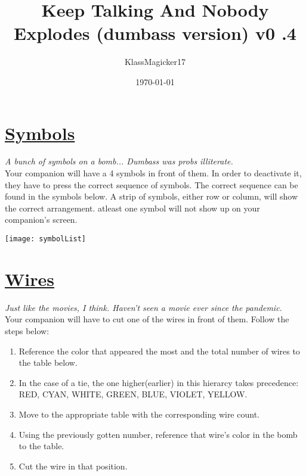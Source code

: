 \documentclass[letterpaper,12pt]{report}
\begin{document}
\title{\textbf{Keep Talking And Nobody Explodes (dumbass version) v0  .4}}
\author{KlassMagicker17}
\date{\today}
\maketitle

\section*{\underline{Symbols}}
\textit{A bunch of symbols on a bomb... Dumbass was probs illiterate.}\\[1cm]
Your companion will have a 4 symbols in front of them. In order to deactivate it,
they have to press the correct sequence of symbols. The correct sequence can be found in the symbols below. A strip of symbols, either row or column, will show the correct arrangement. atleast one symbol will not show up on your companion's screen.
\begin{center}
  \texttt{[image: symbolList]}
\end{center}
\pagebreak

\section*{\underline{Wires}}
\textit{Just like the movies, I think. Haven't seen a movie ever since the pandemic.}\\[1cm]
Your companion will have to cut one of the wires in front of them. Follow the steps below:

\begin{enumerate}
  \item Reference the color that appeared the most and the total number of wires to the table below.
  \item In the case of a tie, the one higher(earlier) in this hierarcy takes precedence: RED, CYAN, WHITE, GREEN, BLUE, VIOLET, YELLOW.
  \item Move to the appropriate table with the corresponding wire count.
  \item Using the previously gotten number, reference that wire's color in the bomb to the table.
  \item Cut the wire in that position.
\end{enumerate}
\end{document}
